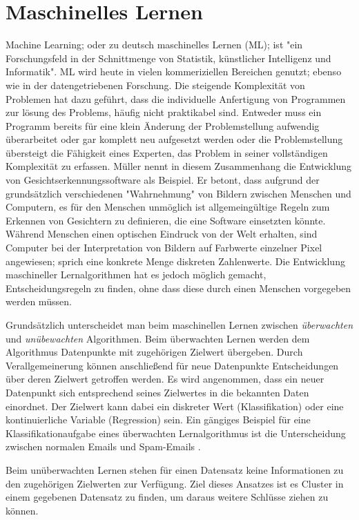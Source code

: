 \chapter{Maschinelles Lernen}
\label{ch:maschinelles lernen}

Machine Learning; oder zu deutsch maschinelles Lernen (ML); ist "ein Forschungsfeld in der Schnittmenge von Statistik, künstlicher Intelligenz und Informatik"\cite[S.~1]{Muller.2017}. ML wird heute in vielen kommeriziellen Bereichen genutzt; ebenso wie in der datengetriebenen Forschung. Die steigende Komplexität von Problemen hat dazu geführt, dass die individuelle Anfertigung von Programmen zur lösung des Problems, häufig nicht praktikabel sind. Entweder muss ein Programm bereits für eine klein Änderung der Problemstellung aufwendig überarbeitet oder gar komplett neu aufgesetzt werden oder die Problemstellung übersteigt die Fähigkeit eines Experten, das Problem in seiner vollständigen Komplexität zu erfassen. Müller \cite{Muller.2017} nennt in diesem Zusammenhang die Entwicklung von Gesichtserkennungssoftware als Beispiel. Er betont, dass aufgrund der grundsätzlich verschiedenen "Wahrnehmung" von Bildern zwischen Menschen und Computern, es für den Menschen unmöglich ist allgemeingültige Regeln zum Erkennen von Gesichtern zu definieren, die eine Software einsetzten könnte. Während Menschen einen optischen Eindruck von der Welt erhalten, sind Computer bei der Interpretation von Bildern auf Farbwerte einzelner Pixel angewiesen; sprich eine konkrete Menge diskreten Zahlenwerte. Die Entwicklung maschineller Lernalgorithmen hat es jedoch möglich gemacht, Entscheidungsregeln zu finden, ohne dass diese durch einen Menschen vorgegeben werden müssen.

Grundsätzlich unterscheidet man beim maschinellen Lernen zwischen \textit{überwachten} und \textit{unübewachten} Algorithmen. Beim überwachten Lernen werden dem Algorithmus Datenpunkte mit zugehörigen Zielwert übergeben. Durch Verallgemeinerung können anschließend für neue Datenpunkte Entscheidungen über deren Zielwert getroffen werden. Es wird angenommen, dass ein neuer Datenpunkt sich entsprechend seines Zielwertes in die bekannten Daten einordnet. Der Zielwert kann dabei ein diskreter Wert (Klassifikation) oder eine kontinuierliche Variable (Regression) sein. Ein gängiges Beispiel für eine Klassifikationaufgabe eines überwachten Lernalgorithmus ist die Unterscheidung zwischen normalen Emails und Spam-Emails \cite[S.~2]{Muller.2017}.

Beim unüberwachten Lernen stehen für einen Datensatz keine Informationen zu den zugehörigen Zielwerten zur Verfügung. Ziel dieses Ansatzes ist es Cluster in einem gegebenen Datensatz zu finden, um daraus weitere Schlüsse ziehen zu können.


